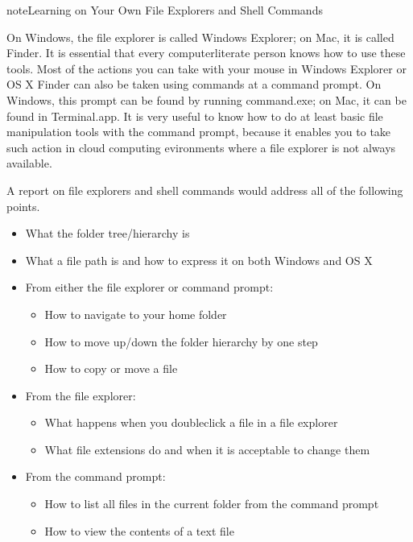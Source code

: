 \documentclass[letterpaper,10pt,english]{sphinxmanual}
\begin{document}
\begin{sphinxadmonition}{note}{Learning on Your Own \sphinxhyphen{} File Explorers and Shell Commands}

On Windows, the file explorer is called Windows Explorer; on Mac, it is called Finder.  It is essential that every computer\sphinxhyphen{}literate person knows how to use these tools.  Most of the actions you can take with your mouse in Windows Explorer or OS X Finder can also be taken using commands at a command prompt.  On Windows, this prompt can be found by running command.exe; on Mac, it can be found in Terminal.app.  It is very useful to know how to do at least basic file manipulation tools with the command prompt, because it enables you to take such action in cloud computing evironments where a file explorer is not always available.
\end{sphinxadmonition}

A report on file explorers and shell commands would address all of the following points.
\begin{itemize}
\item {} 
What the folder tree/hierarchy is

\item {} 
What a file path is and how to express it on both Windows and OS X

\item {} 
From either the file explorer or command prompt:
\begin{itemize}
\item {} 
How to navigate to your home folder

\item {} 
How to move up/down the folder hierarchy by one step

\item {} 
How to copy or move a file

\end{itemize}

\item {} 
From the file explorer:
\begin{itemize}
\item {} 
What happens when you double\sphinxhyphen{}click a file in a file explorer

\item {} 
What file extensions do and when it is acceptable to change them

\end{itemize}

\item {} 
From the command prompt:
\begin{itemize}
\item {} 
How to list all files in the current folder from the command prompt

\item {} 
How to view the contents of a text file

\end{itemize}

\end{itemize}
\end{document}
